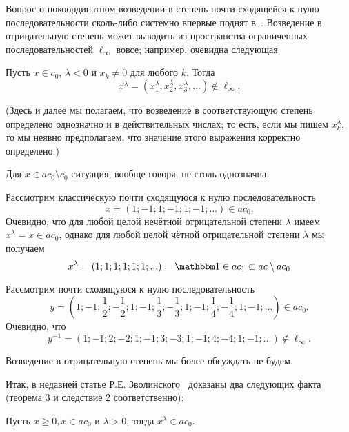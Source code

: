 Вопрос о покоординатном возведении в степень почти сходящейся к нулю последовательности сколь-либо системно впервые поднят в~\cite{zvol2022ac}.
Возведение в отрицательную степень может выводить из пространства ограниченных последовательностей $\ell_\infty$ вовсе;
например, очевидна следующая
\begin{lemma}
	Пусть $x\in c_0$, $\lambda< 0$ и $x_k\ne 0 $ для любого $k$.
	Тогда
	\begin{equation*}
		x^\lambda = (x_1^\lambda,x_2^\lambda,x_3^\lambda,...) \notin \ell_\infty
		.
	\end{equation*}
\end{lemma}
(Здесь и далее мы полагаем, что возведение в соответствующую степень определено однозначно и в действительных числах;
то есть, если мы пишем $x_k^\lambda$, то мы неявно предполагаем, что значение этого выражения корректно определено.)


Для $x\in ac_0\setminus c_0$ ситуация, вообще говоря, не столь однозначна.

\begin{example}
	\label{example:ac0_pow_signum_classic}
	Рассмотрим классическую почти сходящуюся к нулю последовательность
	\begin{equation}
		x = (1;-1;1;-1;1;-1;...) \in ac_0
		.
	\end{equation}
	Очевидно, что для любой целой нечётной отрицательной степени $\lambda$ имеем $x^\lambda = x \in ac_0$,
	однако для любой целой чётной отрицательной степени $\lambda$ мы получаем
	\begin{equation}
		x^\lambda = (1;1;1;1;1;1;...) = \one \in ac_1 \subset ac \setminus ac_0
	\end{equation}
\end{example}

\begin{example}
	Рассмотрим почти сходящуюся к нулю последовательность
	\begin{equation}
		y = \left(1;-1;\frac12;-\frac12;1;-1;\frac13;-\frac13;1;-1;\frac14;-\frac14;1;-1;...\right) \in ac_0
		.
	\end{equation}
	Очевидно, что
	\begin{equation}
		y^{-1} = \left(1;-1;2;-2;1;-1;3;-3;1;-1;4;-4;1;-1;...\right)  \notin \ell_\infty
		.
	\end{equation}
\end{example}

Возведение в отрицательную степень мы более обсуждать не будем.

Итак, в недавней статье Р.Е. Зволинского~\cite{zvol2022ac} доказаны два следующих факта (теорема 3 и следствие 2 соответственно):
\begin{theorem}
	\label{thm:Zvol_pow_pos}
	Пусть $x \geqslant 0, x \in a c_0$ и $\lambda>0$, тогда $x^\lambda \in a c_0$.
\end{theorem}

